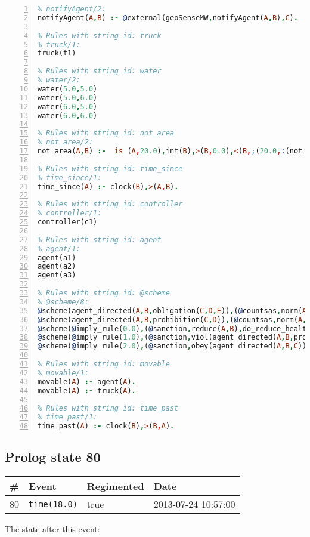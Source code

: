 \documentclass[11pt]{article}\usepackage[utf8]{inputenc}\usepackage{geometry}
\begin{document}
\begin{lstlisting}[language=Prolog, numbers=left]
% Rules with string id: notifyAgent
% notifyAgent/2:
notifyAgent(A,B) :- @external(geoSenseMW,notifyAgent(A,B),C).

% Rules with string id: truck
% truck/1:
truck(t1)

% Rules with string id: water
% water/2:
water(5.0,5.0)
water(5.0,6.0)
water(6.0,5.0)
water(6.0,6.0)

% Rules with string id: not_area
% not_area/2:
not_area(A,B) :-  is (A,20.0),int(B),>(B,0.0),<(B,;(20.0,:(not_area(A,B), is (-(B),20.0)))),int(A),>(A,0.0),<(A,;(20.0,:(area(A,B),-(int(A))))),int(B),>(A,0.0),>(B,0.0),<(A,21.0),<(B,21.0).

% Rules with string id: time_since
% time_since/1:
time_since(A) :- clock(B),>(A,B).

% Rules with string id: controller
% controller/1:
controller(c1)

% Rules with string id: agent
% agent/1:
agent(a1)
agent(a2)
agent(a3)

% Rules with string id: @scheme
% @scheme/8:
@scheme(agent_directed(A,B,obligation(C,D,E)),(@countsas,norm(A,B,F,obligation(C,D,E)),F),false,(listTrue(C)),(time_past(D)),false,[plus(viol(agent_directed(A,B,obligation(C,D,E))))|[]],[plus(obey(agent_directed(A,B,obligation(C,D,E))))|[]])
@scheme(agent_directed(A,B,prohibition(C,D)),(@countsas,norm(A,B,E,prohibition(C,D)),E),(listTrue(C)),false,(false),false,[plus(viol(agent_directed(A,B,prohibition(C,D))))|[]],[plus(obey(agent_directed(A,B,prohibition(C,D))))|[]])
@scheme(@imply_rule(0.0),(@sanction,reduce(A,B),do_reduce_health(A,B),notifyAgent(A,changed(status))),true,false,false,false,[min(reduce(A,B))|[]],[])
@scheme(@imply_rule(1.0),(@sanction,viol(agent_directed(A,B,prohibition(C,D))),do_sanction(D)),true,false,false,false,[min(viol(agent_directed(A,B,prohibition(C,D))))|[]],[])
@scheme(@imply_rule(2.0),(@sanction,obey(agent_directed(A,B,C))),true,false,false,false,[min(obey(agent_directed(A,B,C)))|[]],[])

% Rules with string id: movable
% movable/1:
movable(A) :- agent(A).
movable(A) :- truck(A).

% Rules with string id: time_past
% time_past/1:
time_past(A) :- clock(B),>(B,A).

\end{lstlisting}
\clearpage 
\subsection{Prolog state 80}
\begin{table}[ht]
\centering 
\begin{tabular}{l l l l} 
\textbf{\#} & \textbf{Event} & \textbf{Regimented} & \textbf{Date} \\ [0.5ex] 
\hline
80&\texttt{time(18.0)}&true&2013-07-24 10:57:00\\ [1ex] \hline\end{tabular}
\end{table}
The state after this event:
\end{document}
